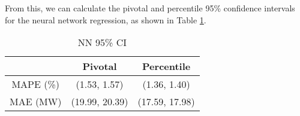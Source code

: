 \documentclass[11pt]{article}
\begin{document}


\noindent From this, we can calculate the pivotal and percentile 95\% confidence intervals for the neural network regression, as shown in Table \ref{table:nn_CI}.

\begin{table}[H]
\centering
\caption{NN 95\% CI}
\label{table:nn_CI}
\begin{tabular}{ccc}
\hline
 & \textbf{Pivotal} & \textbf{Percentile}\\ \hline
MAPE (\%) & (1.53, 1.57) & (1.36, 1.40)\\
MAE (MW) & (19.99, 20.39) & (17.59, 17.98)\\ \hline
\end{tabular}
\end{table}
\end{document}

